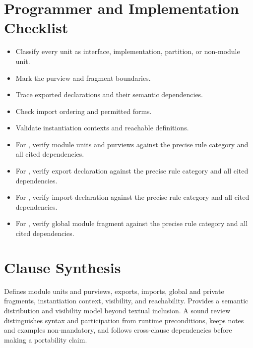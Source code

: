 \documentclass[11pt,letterpaper]{article}
\begin{document}
\section{Programmer and Implementation Checklist}
\begin{CornellReferenceChecklistBox}\begin{itemize}[label=$\square$]
\item Classify every unit as interface, implementation, partition, or non-module unit.
\item Mark the purview and fragment boundaries.
\item Trace exported declarations and their semantic dependencies.
\item Check import ordering and permitted forms.
\item Validate instantiation contexts and reachable definitions.
\item For , verify module units and purviews against the precise rule category and all cited dependencies.
\item For , verify export declaration against the precise rule category and all cited dependencies.
\item For , verify import declaration against the precise rule category and all cited dependencies.
\item For , verify global module fragment against the precise rule category and all cited dependencies.
\end{itemize}\end{CornellReferenceChecklistBox}
\section{Clause Synthesis}
\begin{CornellReferenceOrientationBox}Defines module units and purviews, exports, imports, global and private fragments, instantiation context, visibility, and reachability. Provides a semantic distribution and visibility model beyond textual inclusion. A sound review distinguishes syntax and participation from runtime preconditions, keeps notes and examples non-mandatory, and follows cross-clause dependencies before making a portability claim.\end{CornellReferenceOrientationBox}
\end{document}

